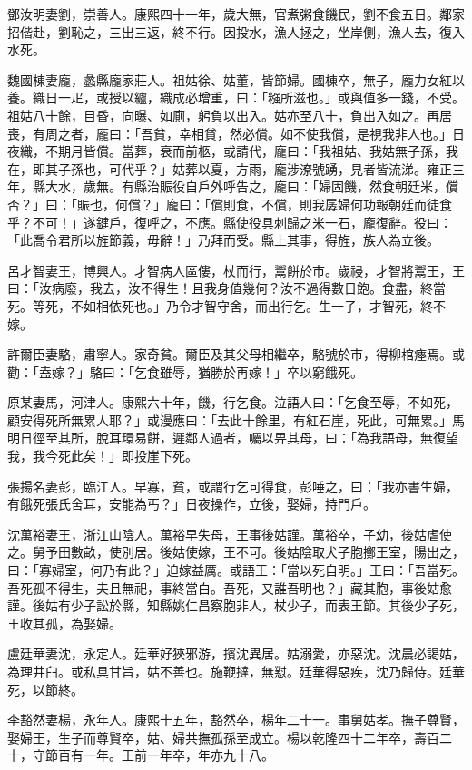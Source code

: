 \begin{pinyinscope}
鄧汝明妻劉，崇善人。康熙四十一年，歲大無，官煮粥食饑民，劉不食五日。鄰家招偕赴，劉恥之，三出三返，終不行。因投水，漁人拯之，坐岸側，漁人去，復入水死。

魏國棟妻龐，蠡縣龐家莊人。祖姑徐、姑董，皆節婦。國棟卒，無子，龐力女紅以養。織日一疋，或授以纑，織成必增重，曰：「糨所滋也。」或與值多一錢，不受。祖姑八十餘，目昏，向曝、如廁，躬負以出入。姑亦至八十，負出入如之。再居喪，有周之者，龐曰：「吾貧，幸相貸，然必償。如不使我償，是視我非人也。」日夜織，不期月皆償。當葬，衰而前柩，或請代，龐曰：「我祖姑、我姑無子孫，我在，即其子孫也，可代乎？」姑葬以夏，方雨，龐涉潦號踴，見者皆流涕。雍正三年，縣大水，歲無。有縣治賑役自戶外呼告之，龐曰：「婦固饑，然食朝廷米，償否？」曰：「賑也，何償？」龐曰：「償則食，不償，則我孱婦何功報朝廷而徒食乎？不可！」遂鍵戶，復呼之，不應。縣使役具刺歸之米一石，龐復辭。役曰：「此喬令君所以旌節義，毋辭！」乃拜而受。縣上其事，得旌，族人為立後。

呂才智妻王，博興人。才智病人區僂，杖而行，鬻餅於市。歲祲，才智將鬻王，王曰：「汝病廢，我去，汝不得生！且我身值幾何？汝不過得數日飽。食盡，終當死。等死，不如相依死也。」乃令才智守舍，而出行乞。生一子，才智死，終不嫁。

許爾臣妻駱，肅寧人。家奇貧。爾臣及其父母相繼卒，駱號於市，得柳棺瘞焉。或勸：「盍嫁？」駱曰：「乞食雖辱，猶勝於再嫁！」卒以窮餓死。

原某妻馬，河津人。康熙六十年，饑，行乞食。泣語人曰：「乞食至辱，不如死，顧安得死所無累人耶？」或漫應曰：「去此十餘里，有紅石崖，死此，可無累。」馬明日徑至其所，脫耳環易餅，遲鄰人過者，囑以畀其母，曰：「為我語母，無復望我，我今死此矣！」即投崖下死。

張揚名妻彭，臨江人。早寡，貧，或謂行乞可得食，彭唾之，曰：「我亦書生婦，有餓死張氏舍耳，安能為丐？」日夜操作，立後，娶婦，持門戶。

沈萬裕妻王，浙江山陰人。萬裕早失母，王事後姑謹。萬裕卒，子幼，後姑虐使之。舅予田數畝，使別居。後姑使嫁，王不可。後姑陰取犬子胞擲王室，陽出之，曰：「寡婦室，何乃有此？」迫嫁益厲。或語王：「當以死自明。」王曰：「吾當死。吾死孤不得生，夫且無祀，事終當白。吾死，又誰吾明也？」藏其胞，事後姑愈謹。後姑有少子訟於縣，知縣姚仁昌察胞非人，杖少子，而表王節。其後少子死，王收其孤，為娶婦。

盧廷華妻沈，永定人。廷華好狹邪游，擯沈異居。姑溺愛，亦惡沈。沈晨必謁姑，為理井臼。或私具甘旨，姑不善也。施鞭撻，無懟。廷華得惡疾，沈乃歸侍。廷華死，以節終。

李豁然妻楊，永年人。康熙十五年，豁然卒，楊年二十一。事舅姑孝。撫子尊賢，娶婦王，生子而尊賢卒，姑、婦共撫孤孫至成立。楊以乾隆四十二年卒，壽百二十，守節百有一年。王前一年卒，年亦九十八。


\end{pinyinscope}
